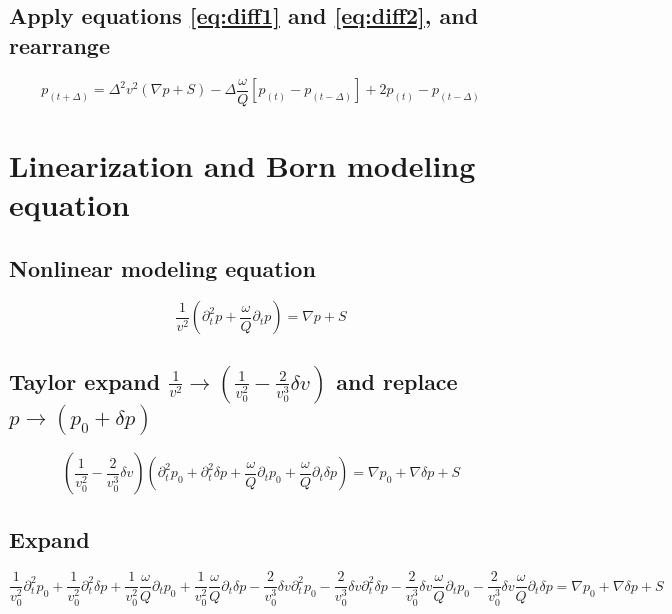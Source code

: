 \documentclass[10pt,fleqn]{article}
\begin{document}
\subsection{Apply equations \ref{eq:diff1} and \ref{eq:diff2}, and rearrange}
\begin{equation}
	p_{(t+\Delta)} = \Delta^2 v^2 \left( \nabla p + S \right) - \Delta \frac{\omega}{Q} \left[ p_{(t)} - p_{(t - \Delta)} \right]
	+ 2 p_{(t)} - p_{(t - \Delta)}
\end{equation}

\newpage
\section{Linearization and Born modeling equation}

\subsection{Nonlinear modeling equation}
\begin{equation}
	\frac{1}{v^2} \left( \partial_t^2 p + \frac{\omega}{Q} \partial_t p \right) = \nabla p + S
\end{equation}

\subsection{Taylor expand $\displaystyle \frac{1}{v^2} \rightarrow \left( \frac{1}{v_0^2} - \frac{2}{v_0^3} \delta v \right) $
	and replace $\displaystyle p \rightarrow \displaystyle (p_0 + \delta p)$}
\begin{equation}
	\left( \frac{1}{v_0^2} - \frac{2}{v_0^3} \delta v \right) \left( \partial_t^2 p_0 + \partial_t^2 \delta p +
	\frac{\omega}{Q} \partial_t p_0 + \frac{\omega}{Q} \partial_t \delta p \right) =
	\nabla p_0 + \nabla \delta p + S
\end{equation}

\subsection{Expand}
\begin{equation}
	\frac{1}{v_0^2} \partial_t^2 p_0
	+ \frac{1}{v_0^2} \partial_t^2 \delta p
	+ \frac{1}{v_0^2} \frac{\omega}{Q} \partial_t p_0
	+ \frac{1}{v_0^2} \frac{\omega}{Q} \partial_t \delta p
	- \frac{2}{v_0^3} \delta v \partial_t^2 p_0
	- \frac{2}{v_0^3} \delta v \partial_t^2 \delta p
	- \frac{2}{v_0^3} \delta v \frac{\omega}{Q} \partial_t p_0
	- \frac{2}{v_0^3} \delta v \frac{\omega}{Q} \partial_t \delta p
	= \nabla p_0 + \nabla \delta p + S
\end{equation}
\end{document}
